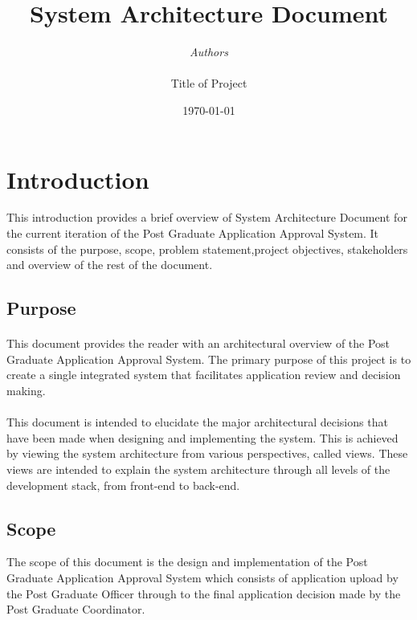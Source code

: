 \documentclass[11pt]{article}
\begin{document}

\thispagestyle{empty}
\title{{\LARGE\bf System Architecture Document}}
\author{{\Large\it Authors} \\
\vspace*{2.5in} 
\mbox{} \\
{\Large Title of Project}
\vspace*{2.5in} 
\mbox{} \\
\date{\today}
}
\maketitle

\tableofcontents

%

\section{Introduction}
This introduction provides a brief overview of System Architecture Document for the current iteration of the Post Graduate Application Approval System. It consists of the purpose, scope, problem statement,project objectives, stakeholders and overview of the rest of the document.
\subsection{Purpose}
\paragraph{}This document provides the reader with an architectural overview of the Post Graduate Application Approval System. The primary purpose of this project is to create a single integrated system that facilitates application review and decision making.

\paragraph{}This document is intended to elucidate the major architectural decisions that have been made when designing and implementing the system. This is achieved by viewing the system architecture from various perspectives, called views. These views are intended to explain the system architecture through all levels of the development stack, from front-end to back-end.


\subsection{Scope}
The scope of this document is the design and implementation of the Post Graduate Application Approval System which consists of application upload by the Post Graduate Officer through to the final application decision made by the Post Graduate Coordinator.
\end{document}
